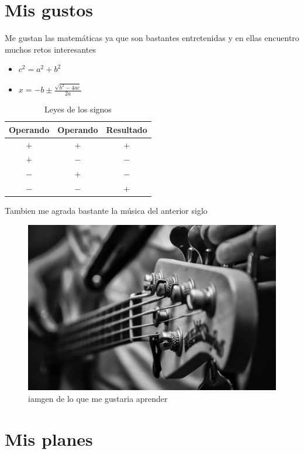 \chapter*{Mis gustos}

Me gustan las matemáticas ya que son bastantes entretenidas y en ellas encuentro muchos retos interesantes
\begin{itemize}
\item $c^2 = a^2 + b^2$
\item $x=-b \pm \frac{\sqrt{b^2-4ac}}{2a}$
\end{itemize}


\begin{table}[h]
  \centering
  \begin{tabular}{| c  c  c  |}
    \hline
    Operando & Operando & Resultado\\\hline
    $+$ & $+$ & $+$\\\hline
    $+$ & $-$ & $-$\\\hline
    $-$ & $+$ & $-$\\\hline
    $-$ & $-$ & $+$\\\hline    
  \end{tabular}
  \caption{Leyes de los signos}
  \label{tabla:leyes_signos}
\end{table}

Tambien me agrada bastante la música del anterior siglo
\begin{figure}[h]
  \centering
  \includegraphics[scale=0.5]{IMG/19_1.jpg}
  \caption{iamgen de lo que me gustaria aprender}
  \label{fig:guitarra}
\end{figure}

\chapter{Mis planes}


